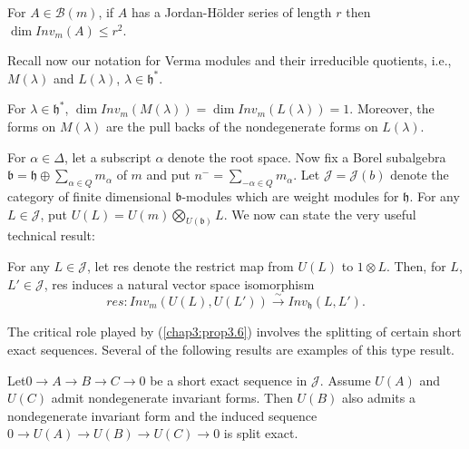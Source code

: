 \begin{prop}\label{chap3:prop3.4}
For $A \in \mathscr{B}(m)$, if $A$ has a Jordan-H\"older series of
length $r$ then $\dim Inv_m(A) \leq r^2$.
\end{prop}

Recall now our notation for Verma modules and their irreducible
quotients, i.e., $M(\lambda)$ and $L(\lambda)$, $\lambda \in
\mathfrak{h}^*$.

\begin{prop}\label{chap3:prop3.5}%
For $\lambda \in \mathfrak{h}^*$, $\dim Inv_m(M(\lambda)) = \dim Inv_m
(L(\lambda)) = 1$. Moreover, the forms on $M(\lambda)$ are the pull
backs of the nondegenerate forms on $L(\lambda)$. 
\end{prop}

For $\alpha \in \Delta$, let a subscript $\alpha$ denote the root
space. Now fix a Borel subalgebra $\mathfrak{b} = \mathfrak{h} \oplus
\sum\limits_{\alpha \in Q} m_\alpha$ of $m$ and put $n^- =
\sum\limits_{-\alpha \in Q} m_\alpha$. Let $\mathcal{J}=\mathcal{J}(b)$ denote the
category of finite dimensional $\mathfrak{b}$-modules which are weight
modules for $\mathfrak{h}$. For any $L \in \mathcal{J}$, put $U(L) = U(m)
\bigotimes\limits_{U(\mathfrak{b})} L$. We now can state the very
useful technical result:

\begin{prop}\label{chap3:prop3.6}%
For any $L \in \mathcal{J}$, let res denote the restrict map from $U(L)$ to $1
\otimes L$. Then, for $L$, $L' \in \mathcal{J}$, res induces a natural vector
space isomorphism
$$
res: Inv_m (U(L), U(L')) \xrightarrow{\sim} Inv_\mathfrak{h} (L, L').
$$
\end{prop}

The critical role played by (\ref{chap3:prop3.6}) involves the
splitting of certain short exact sequences. Several of the following
results are examples of this type result. 

\begin{lemma}\label{chap3:lem3.7}
Let\pageoriginale $0\to A \to B \to C \to 0$ be a short exact sequence
in $\mathcal{J}$. Assume $U(A)$ and $U(C)$ admit nondegenerate
invariant forms. Then $U(B)$ also admits a nondegenerate invariant
form and the induced sequence $0 \to U(A) \to U(B) \to U(C) \to 0$ is
split exact.
\end{lemma}

